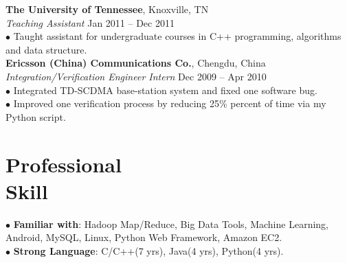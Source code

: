 \documentclass[margin, centered]{resume}
\begin{document}
\begin{resume}
    \textbf{The University of Tennessee}, Knoxville, TN \\\vspace{0mm}%
    \emph{Teaching Assistant} \hfill Jan 2011 -- Dec 2011\vspace{0mm}\\
    $\bullet$ Taught assistant for undergraduate courses in C++ programming, algorithms and data structure.\vspace{-6mm}\\
	
    \textbf{Ericsson (China) Communications Co.}, Chengdu, China \vspace{0mm}\\%
	\emph{Integration/Verification Engineer Intern} \hfill Dec 2009 -- Apr 2010\vspace{0mm}\\
    $\bullet$ Integrated TD-SCDMA base-station system and fixed one software bug.\vspace{0mm}\\
    $\bullet$ Improved one verification process by reducing 25\% percent of time via my Python script.\vspace{-5mm}\\

    \section{\mysidestyle Professional \\Skill} 
	
	$\bullet$ \textbf{Familiar with}: Hadoop Map/Reduce, Big Data Tools, Machine Learning, Android, MySQL, Linux, Python Web Framework, Amazon EC2.\vspace{0mm}\\
    $\bullet$ \textbf{Strong Language}: C/C++(7 yrs), Java(4 yrs), Python(4 yrs).\vspace{-5mm}\\


\end{resume}
\end{document}
